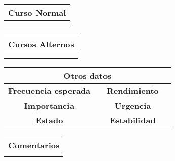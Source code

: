 \begin{table}[!h]
\begin{tabular}{|c|c|c|c|}
\hline
\multicolumn{4}{|c|}{Curso Normal} \\
\hline
              &               &              &              \\
\hline
              &               &              &              \\
\hline
\end{tabular}
\end{table}

\begin{table}[!h]
\begin{tabular}{|c|c|}
\hline
\multicolumn{2}{|c|}{Cursos Alternos} \\
\hline
              &              \\
\hline
              &              \\
\hline
\end{tabular}
\end{table}

\begin{table}[!h]
\begin{tabular}{|c|c|c|c|}
\hline
\multicolumn{4}{|c|}{Otros datos} \\
\hline
 \textbf{Frecuencia esperada}             &               &    \textbf{Rendimiento}          &              \\
\hline
 \textbf{Importancia}             &               &     \textbf{Urgencia}         &              \\
\hline
 \textbf{Estado}             &               &    \textbf{Estabilidad}          &              \\
\hline
\end{tabular}
\end{table}


\begin{table}[!h]
\begin{tabular}{|c|}
\hline
\textbf{Comentarios} \\
\hline
                  \\
\hline
\end{tabular}
\end{table}










